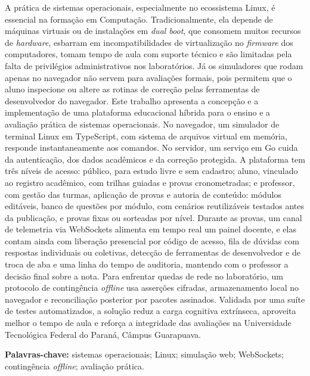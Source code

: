 \setlength{\absparsep}{18pt}
\begin{resumo}
\OnehalfSpacing
A prática de sistemas operacionais, especialmente no ecossistema Linux, é essencial na formação em Computação. Tradicionalmente, ela depende de máquinas virtuais ou de instalações em \textit{dual boot}, que consomem muitos recursos de \textit{hardware}, esbarram em incompatibilidades de virtualização no \textit{firmware} dos computadores, tomam tempo de aula com suporte técnico e são limitadas pela falta de privilégios administrativos nos laboratórios. Já os simuladores que rodam apenas no navegador não servem para avaliações formais, pois permitem que o aluno inspecione ou altere as rotinas de correção pelas ferramentas de desenvolvedor do navegador. Este trabalho apresenta a concepção e a implementação de uma plataforma educacional híbrida para o ensino e a avaliação prática de sistemas operacionais. No navegador, um simulador de terminal Linux em TypeScript, com sistema de arquivos virtual em memória, responde instantaneamente aos comandos. No servidor, um serviço em Go cuida da autenticação, dos dados acadêmicos e da correção protegida. A plataforma tem três níveis de acesso: público, para estudo livre e sem cadastro; aluno, vinculado ao registro acadêmico, com trilhas guiadas e provas cronometradas; e professor, com gestão das turmas, aplicação de provas e autoria de conteúdo: módulos editáveis, banco de questões por módulo, com cenários reutilizáveis testados antes da publicação, e provas fixas ou sorteadas por nível. Durante as provas, um canal de telemetria via WebSockets alimenta em tempo real um painel docente, e elas contam ainda com liberação presencial por código de acesso, fila de dúvidas com respostas individuais ou coletivas, detecção de ferramentas de desenvolvedor e de troca de aba e uma linha do tempo de auditoria, mantendo com o professor a decisão final sobre a nota. Para enfrentar quedas de rede no laboratório, um protocolo de contingência \textit{offline} usa asserções cifradas, armazenamento local no navegador e reconciliação posterior por pacotes assinados. Validada por uma suíte de testes automatizados, a solução reduz a carga cognitiva extrínseca, aproveita melhor o tempo de aula e reforça a integridade das avaliações na Universidade Tecnológica Federal do Paraná, Câmpus Guarapuava.

\vspace{\onelineskip}
\noindent\textbf{Palavras-chave:} sistemas operacionais; Linux; simulação web; WebSockets; contingência \textit{offline}; avaliação prática.
\end{resumo}
